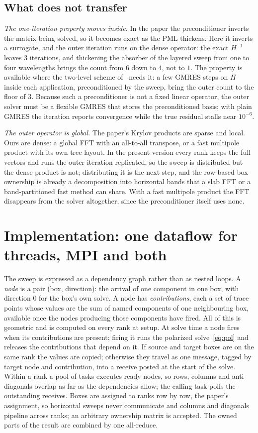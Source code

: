 \documentclass[11pt]{article}
\begin{document}
\subsection{What does not transfer}

\emph{The one-iteration property moves inside.} In the paper the preconditioner inverts the
matrix being solved, so it becomes exact as the PML thickens. Here it inverts a
surrogate, and the outer iteration runs on the dense operator: the exact $H^{-1}$ leaves
$3$ iterations, and thickening the absorber of the layered sweep from one to four
wavelengths brings the count from $6$ down to $4$, not to $1$. The property is
available where the two-level scheme of~\cite{ZepedaZhao2016} needs it: a few GMRES steps
on $H$ inside each application, preconditioned by the sweep, bring the outer count to the
floor of $3$. Because such a preconditioner is not a fixed linear operator, the outer
solver must be a flexible GMRES that stores the preconditioned basis; with plain GMRES the
iteration reports convergence while the true residual stalls near $10^{-6}$.

\emph{The outer operator is global.} The paper's Krylov products are sparse and local.
Ours are dense: a global FFT with an all-to-all transpose, or a fast multipole product
with its own tree layout. In the present version every rank keeps the full vectors and
runs the outer iteration replicated, so the sweep is distributed but the dense product is
not; distributing it is the next step, and the row-based box ownership is already a
decomposition into horizontal bands that a slab FFT or a band-partitioned fast method can
share. With a fast multipole product the FFT disappears from the solver altogether, since
the preconditioner itself uses none.

\section{Implementation: one dataflow for threads, MPI and both}

The sweep is expressed as a dependency graph rather than as nested loops. A \emph{node}
is a pair (box, direction): the arrival of one component in one box, with direction
$0$ for the box's own solve. A node has \emph{contributions}, each a set of trace points
whose values are the sum of named components of one neighbouring box, available once the
nodes producing those components have fired. All of this is geometric and is computed on
every rank at setup. At solve time a node fires when its contributions are present; firing
it runs the polarized solve~\eqref{eq:pol} and releases the contributions that depend on
it. If source and target boxes are on the same rank the values are copied; otherwise
they travel as one message, tagged by target node and contribution, into a receive posted
at the start of the solve. Within a rank a pool of tasks executes ready nodes, so rows,
columns and anti-diagonals overlap as far as the dependencies allow; the calling task
polls the outstanding receives. Boxes are assigned to ranks row by row, the paper's
assignment, so horizontal sweeps never communicate and columns and diagonals pipeline
across ranks; an arbitrary ownership matrix is accepted. The owned parts of the result
are combined by one all-reduce.
\end{document}
